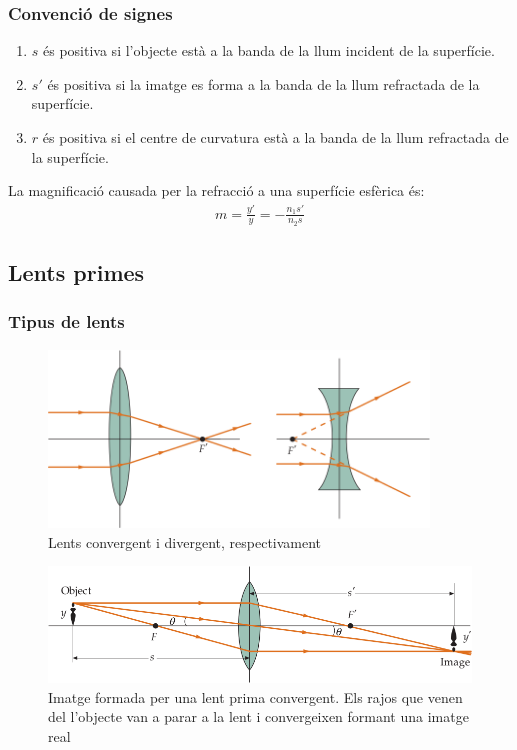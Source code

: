 \subsubsection*{Convenció de signes}
\begin{enumerate}
    \item $s$ és positiva si l'objecte està a la banda de la llum incident de la superfície.
    \item $s'$ és positiva si la imatge es forma a la banda de la llum refractada de la superfície.
    \item $r$ és positiva si el centre de curvatura està a la banda de la llum refractada de la superfície.
\end{enumerate}
La magnificació causada per la refracció a una superfície esfèrica és:
\begin{align}
    \boxed{m = \frac{y'}{y} = - \frac{n_{1} s'}{n_{2} s}}
\end{align}

\subsection{Lents primes}
\subsubsection*{Tipus de lents}
\begin{figure}[H]
\centering
    \includegraphics[width=0.9\textwidth]{images/4/44-conv-div.png}
\caption{Lents convergent i divergent, respectivament}
\end{figure}
\begin{figure}[H]
\centering
    \includegraphics[width=\textwidth]{images/4/44-lents-primes.png}
\caption{Imatge formada per una lent prima convergent. Els rajos que venen del l'objecte van a parar a la lent i convergeixen formant una imatge real}
\end{figure}

